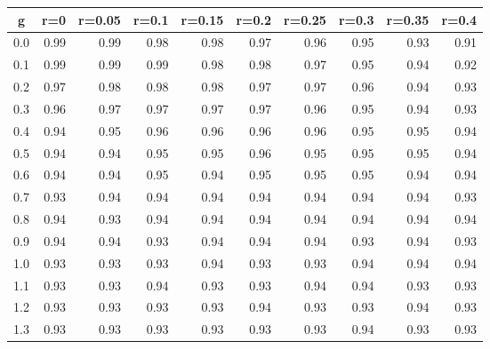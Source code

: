 %
\begin{table}[!tbp]
 \begin{center}
 \begin{tabular}{rrrrrrrrrr}\hline\hline
\multicolumn{1}{c}{g}&\multicolumn{1}{c}{r=0}&\multicolumn{1}{c}{r=0.05}&\multicolumn{1}{c}{r=0.1}&\multicolumn{1}{c}{r=0.15}&\multicolumn{1}{c}{r=0.2}&\multicolumn{1}{c}{r=0.25}&\multicolumn{1}{c}{r=0.3}&\multicolumn{1}{c}{r=0.35}&\multicolumn{1}{c}{r=0.4}\tabularnewline
\hline
0.0&0.99&0.99&0.98&0.98&0.97&0.96&0.95&0.93&0.91\tabularnewline
0.1&0.99&0.99&0.99&0.98&0.98&0.97&0.95&0.94&0.92\tabularnewline
0.2&0.97&0.98&0.98&0.98&0.97&0.97&0.96&0.94&0.93\tabularnewline
0.3&0.96&0.97&0.97&0.97&0.97&0.96&0.95&0.94&0.93\tabularnewline
0.4&0.94&0.95&0.96&0.96&0.96&0.96&0.95&0.95&0.94\tabularnewline
0.5&0.94&0.94&0.95&0.95&0.96&0.95&0.95&0.95&0.94\tabularnewline
0.6&0.94&0.94&0.95&0.94&0.95&0.95&0.95&0.94&0.94\tabularnewline
0.7&0.93&0.94&0.94&0.94&0.94&0.94&0.94&0.94&0.93\tabularnewline
0.8&0.94&0.93&0.94&0.94&0.94&0.94&0.94&0.94&0.94\tabularnewline
0.9&0.94&0.94&0.93&0.94&0.94&0.94&0.93&0.94&0.93\tabularnewline
1.0&0.93&0.93&0.93&0.94&0.93&0.93&0.94&0.94&0.94\tabularnewline
1.1&0.93&0.93&0.94&0.93&0.93&0.94&0.94&0.93&0.93\tabularnewline
1.2&0.93&0.93&0.93&0.93&0.94&0.93&0.93&0.94&0.93\tabularnewline
1.3&0.93&0.93&0.93&0.93&0.93&0.93&0.94&0.93&0.93\tabularnewline
\hline
\end{tabular}

\end{center}

\end{table}

